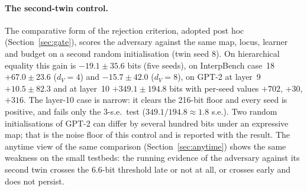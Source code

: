 \documentclass[11pt,a4paper]{article}
\newcommand{\dv}{d_V}
\begin{document}
\paragraph{The second-twin control.} The comparative form of the rejection criterion, adopted post hoc (Section~\ref{sec:gate}), scores the adversary against the same map, locus, learner and budget on a second random initialisation (twin seed 8). On hierarchical equality this gain is $-19.1\pm35.6$ bits (five seeds), on InterpBench case~18 $+67.0\pm23.6$ ($\dv=4$) and $-15.7\pm42.0$ ($\dv=8$), on GPT-2 at layer~9 $+10.5\pm82.3$ and at layer~10 $+349.1\pm194.8$ bits with per-seed values $+702$, $+30$, $+316$. The layer-10 case is narrow: it clears the 216-bit floor and every seed is positive, and fails only the 3-s.e.\ test ($349.1/194.8\approx1.8$ s.e.). Two random initialisations of GPT-2 can differ by several hundred bits under an expressive map; that is the noise floor of this control and is reported with the result. The anytime view of the same comparison (Section~\ref{sec:anytime}) shows the same weakness on the small testbeds: the running evidence of the adversary against its second twin crosses the 6.6-bit threshold late or not at all, or crosses early and does not persist.
\end{document}

